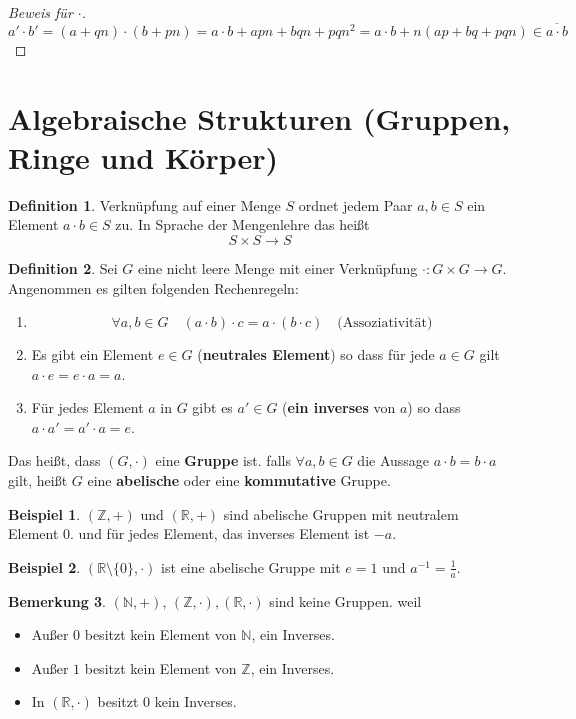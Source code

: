 \documentclass{article}
\theoremstyle{definition}
\newtheorem{definition}{Definition}[section]
\newtheorem{bem}[definition]{Bemerkung}
\newtheorem*{bei*}{Beispiel}
\theoremstyle{plain}
\begin{document}
\begin{tcolorbox}[colback={white}, colframe={DarkGreen},breakable]
	\begin{proof}[Beweis f\"ur $ \cdot $]
		{
			\color{blue}
			\[ 
			a' \cdot b' = (a + qn)\cdot(b + pn) = a \cdot b + apn + bqn + pqn^2 = a\cdot b + n(ap + bq + pqn) \in \overline{a \cdot b}
			\]	
		}
	\end{proof}
\end{tcolorbox}
\newpage
\section{Algebraische Strukturen (Gruppen, Ringe und K\"orper)}
\begin{definition}
	Verkn\"upfung auf einer Menge $ S $ ordnet jedem Paar $ a,b  \in S $ ein Element $ a \cdot b \in S $ zu. In Sprache der Mengenlehre das hei\ss t
	\[ 
	S \times S \to S
	 \]
\end{definition}
\begin{definition}
	Sei $ G $ eine nicht leere Menge mit einer Verkn\"upfung $ \cdot : G \times G \to G $. Angenommen es gilten folgenden Rechenregeln:
	\begin{enumerate}
		\item
		\[ 
		\forall a,b \in G \quad (a \cdot b) \cdot c = a \cdot (b \cdot c) \quad \text{(Assoziativit\"at)}
		 \]
		\item 
		Es gibt ein Element $ e \in G $ (\textbf{neutrales Element}) so dass f\"ur jede $ a \in G $ gilt $ a \cdot e = e \cdot a = a $.
		\item 
		F\"ur jedes Element $ a $ in $ G $ gibt es $ a' \in G $ (\textbf{ein inverses} von $ a $) so dass 
		$ a \cdot a' = a' \cdot a = e $.
	\end{enumerate}
	Das hei\ss t, dass $ (G , \cdot) $ eine \textbf{Gruppe} ist. falls $ \forall a,b \in G $ die Aussage $ a \cdot b = b \cdot a $ gilt, hei\ss t $ G $ eine \textbf{abelische} oder eine \textbf{kommutative} Gruppe.
\end{definition}
\begin{bei*}
	$ (\mathbb{Z} , +) $ und $ (\mathbb{R} , +) $ sind abelische Gruppen mit neutralem Element $ 0 $. und f\"ur jedes Element, das inverses Element ist $ -a $.
\end{bei*}
\begin{bei*}
	$ (\mathbb{R}\setminus \{0\} , \cdot) $ ist eine abelische Gruppe mit $ e=1 $ und $ a^{-1} = \frac{1}{a} $.
\end{bei*}
\begin{bem}
	$ (\mathbb{N} , +) $, $ (\mathbb{Z} , \cdot), (\mathbb{R}, \cdot) $ sind keine Gruppen. weil
	\begin{itemize}
		\item Au\ss er $ 0 $ besitzt kein Element von $ \mathbb{N} $, ein Inverses. 
		\item Au\ss er $ 1 $ besitzt kein Element von $ \mathbb{Z} $, ein Inverses.
		\item In $ (\mathbb{R} , \cdot) $ besitzt $ 0 $ kein Inverses.
	\end{itemize}
\end{bem}
\end{document}
